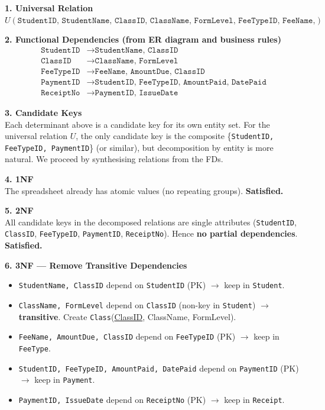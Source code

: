 \documentclass[11pt]{article}
\begin{document}
\begin{exemplebox}
\textbf{1. Universal Relation}\\
$U(\texttt{StudentID, StudentName, ClassID, ClassName, FormLevel, FeeTypeID, FeeName, AmountDue, PaymentID, AmountPaid, DatePaid, ReceiptNo, IssueDate})$

\textbf{2. Functional Dependencies (from ER diagram and business rules)}\\
\begin{align*}
\texttt{StudentID} &\rightarrow \texttt{StudentName, ClassID} \\
\texttt{ClassID} &\rightarrow \texttt{ClassName, FormLevel} \\
\texttt{FeeTypeID} &\rightarrow \texttt{FeeName, AmountDue, ClassID} \\
\texttt{PaymentID} &\rightarrow \texttt{StudentID, FeeTypeID, AmountPaid, DatePaid} \\
\texttt{ReceiptNo} &\rightarrow \texttt{PaymentID, IssueDate}
\end{align*}

\textbf{3. Candidate Keys}\\
Each determinant above is a candidate key for its own entity set. For the universal relation $U$, the only candidate key is the composite \{\texttt{StudentID, FeeTypeID, PaymentID}\} (or similar), but decomposition by entity is more natural. We proceed by synthesising relations from the FDs.

\textbf{4. 1NF}\\
The spreadsheet already has atomic values (no repeating groups). \textbf{Satisfied.}

\textbf{5. 2NF}\\
All candidate keys in the decomposed relations are single attributes (\texttt{StudentID}, \texttt{ClassID}, \texttt{FeeTypeID}, \texttt{PaymentID}, \texttt{ReceiptNo}). Hence \textbf{no partial dependencies}. \textbf{Satisfied.}

\textbf{6. 3NF --- Remove Transitive Dependencies}\\
\begin{itemize}
    \item \texttt{StudentName, ClassID} depend on \texttt{StudentID} (PK) $\rightarrow$ keep in \texttt{Student}.
    \item \texttt{ClassName, FormLevel} depend on \texttt{ClassID} (non-key in \texttt{Student}) $\rightarrow$ \textbf{transitive}. Create \texttt{Class}(\underline{ClassID}, ClassName, FormLevel).
    \item \texttt{FeeName, AmountDue, ClassID} depend on \texttt{FeeTypeID} (PK) $\rightarrow$ keep in \texttt{FeeType}.
    \item \texttt{StudentID, FeeTypeID, AmountPaid, DatePaid} depend on \texttt{PaymentID} (PK) $\rightarrow$ keep in \texttt{Payment}.
    \item \texttt{PaymentID, IssueDate} depend on \texttt{ReceiptNo} (PK) $\rightarrow$ keep in \texttt{Receipt}.
\end{itemize}
\end{exemplebox}
\end{document}
